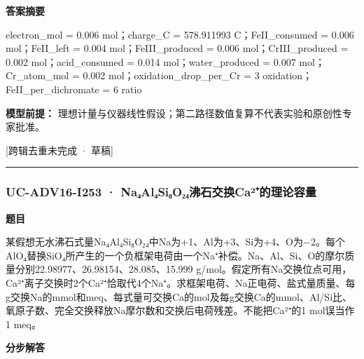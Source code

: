 \documentclass[UTF8,11pt,a4paper]{ctexart}
\begin{document}
\noindent\textbf{答案摘要}\par
electron\_mol = 0.006 mol；charge\_C = 578.911993 C；FeII\_consumed = 0.006 mol；FeII\_left = 0.004 mol；FeIII\_produced = 0.006 mol；CrIII\_produced = 0.002 mol；acid\_consumed = 0.014 mol；water\_produced = 0.007 mol；Cr\_atom\_mol = 0.002 mol；oxidation\_drop\_per\_Cr = 3 oxidation；FeII\_per\_dichromate = 6 ratio\par
\noindent\textbf{模型前提：}
理想计量与仪器线性假设；第二路径数值复算不代表实验和原创性专家批准。\par
\noindent\textcolor{red!65!black}{[跨辑去重未完成 · 草稿]} \par
\medskip\hrule\medskip
{}
\subsubsection*{UC-ADV16-I253 · Na₄Al₄Si₈O₂₄沸石交换Ca²⁺的理论容量}
\noindent\textbf{题目}\par
某假想无水沸石式量Na₄Al₄Si₈O₂₄中Na为+1、Al为+3、Si为+4、O为−2。每个AlO₄替换SiO₄所产生的一个负框架电荷由一个Na⁺补偿。Na、Al、Si、O的摩尔质量分别22.98977、26.98154、28.085、15.999 g/mol。假定所有Na交换位点可用，Ca²⁺离子交换时2个Ca²⁺恰取代4个Na⁺。求框架电荷、Na正电荷、盐式量质量、每g交换Na的mmol和meq、每式量可交换Ca的mol及每g交换Ca的mmol、Al/Si比、氧原子数、完全交换释放Na摩尔数和交换后电荷残差。不能把Ca²⁺的1 mol误当作1 meq。\par
\medskip\noindent\textbf{分步解答}
\end{document}
